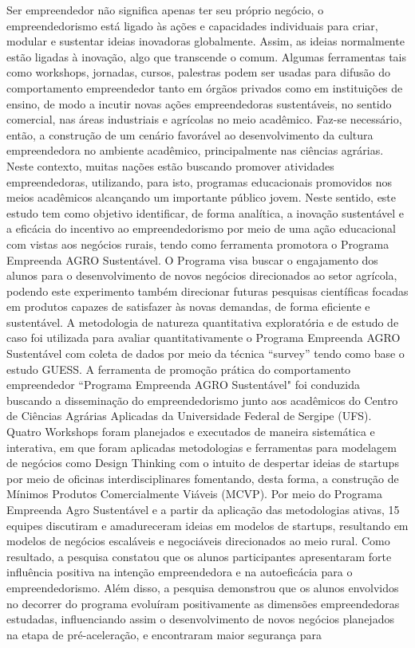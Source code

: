 \setlength{\absparsep}{18pt} %
\begin{resumo}

Ser empreendedor não significa apenas ter seu próprio negócio, o empreendedorismo está ligado às ações e capacidades individuais para criar, modular e sustentar ideias inovadoras globalmente. Assim, as ideias normalmente estão ligadas à inovação, algo que transcende o comum. Algumas ferramentas tais como workshops, jornadas, cursos, palestras podem ser usadas para difusão do comportamento empreendedor tanto em órgãos privados como em instituições de ensino, de modo a incutir novas ações empreendedoras sustentáveis, no sentido comercial, nas áreas industriais e agrícolas no meio acadêmico. Faz-se necessário, então, a construção de um cenário favorável ao desenvolvimento da cultura empreendedora no ambiente acadêmico, principalmente nas ciências agrárias. Neste contexto, muitas nações estão buscando promover atividades empreendedoras, utilizando, para isto, programas educacionais promovidos nos meios acadêmicos alcançando um importante público jovem. Neste sentido, este estudo tem como objetivo identificar, de forma analítica, a inovação sustentável e a eficácia do incentivo ao empreendedorismo por meio de uma ação educacional com vistas aos negócios rurais, tendo como ferramenta promotora o Programa Empreenda AGRO Sustentável. O Programa visa buscar o engajamento dos alunos para o desenvolvimento de novos negócios direcionados ao setor agrícola, podendo este experimento também direcionar futuras pesquisas científicas focadas em produtos capazes de satisfazer às novas demandas, de forma eficiente e sustentável. A metodologia de natureza quantitativa exploratória e de estudo de caso foi utilizada para avaliar quantitativamente o Programa Empreenda AGRO Sustentável com coleta de dados por meio da técnica “survey” tendo como base o estudo GUESS. A ferramenta de promoção prática do comportamento empreendedor “Programa Empreenda AGRO Sustentável" foi conduzida buscando a disseminação do empreendedorismo junto aos acadêmicos do Centro de Ciências Agrárias Aplicadas da Universidade Federal de Sergipe (UFS). Quatro Workshops foram planejados e executados de maneira sistemática e interativa, em que foram aplicadas metodologias e ferramentas para modelagem de negócios como Design Thinking com o intuito de despertar ideias de startups por meio de oficinas interdisciplinares fomentando, desta forma, a construção de Mínimos Produtos Comercialmente Viáveis (MCVP). Por meio do Programa Empreenda Agro Sustentável e a partir da aplicação das metodologias ativas, 15 equipes discutiram e amadureceram ideias em modelos de startups, resultando em modelos de negócios escaláveis e negociáveis direcionados ao meio rural. Como resultado, a pesquisa constatou que os alunos participantes apresentaram forte influência positiva na intenção empreendedora e na autoeficácia para o empreendedorismo. Além disso, a pesquisa demonstrou que os alunos envolvidos no decorrer do programa evoluíram positivamente as dimensões empreendedoras estudadas, influenciando assim o desenvolvimento de novos negócios planejados na etapa de pré-aceleração, e encontraram maior segurança para 
\end{resumo}
